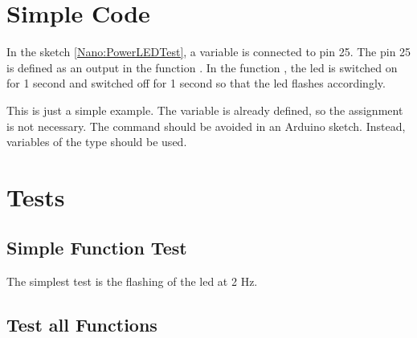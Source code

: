 
%

\section{Simple Code}

In the sketch \ref{Nano:PowerLEDTest}, a variable is connected to pin 25. The pin 25 is defined as an output in the function . In the function , the \ac{led} is switched on for 1 second and switched off for 1 second so that the \ac{led} flashes accordingly.



{
  \label{Nano:PowerLEDTest}
}

\bigskip

This is just a simple example. The variable  is already defined, so the assignment is not necessary. The command  should be avoided in an Arduino sketch. Instead, variables of the type  should be used.



\section{Tests}

\subsection{Simple Function Test}

The simplest test is the flashing of the \ac{led} at 2 Hz.

{
  \label{Nano:PowerLEDTest}
}


\subsection{Test all Functions}

